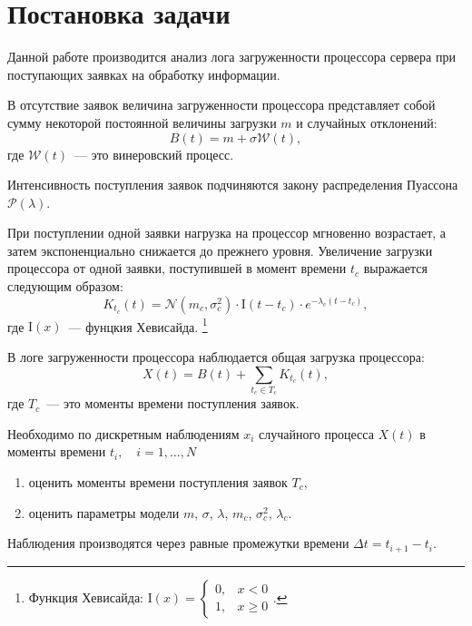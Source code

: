 \documentclass[a4paper,10pt]{article}
\begin{document}



\section{Постановка задачи}
Данной работе производится анализ лога загруженности процессора сервера
при поступающих заявках на обработку информации.

В отсутствие заявок величина загруженности процессора представляет собой 
сумму некоторой постоянной величины загрузки $m$ и случайных отклонений:
$$B(t) = m + \sigma \mathcal{W}(t),$$
где $\mathcal{W}(t)$~--- это винеровский процесс.

Интенсивность поступления заявок подчиняются закону
распределения Пуассона $\mathcal{P}(\lambda)$.

При поступлении одной заявки нагрузка на процессор мгновенно возрастает,
а затем экспоненциально снижается до прежнего уровня.
Увеличение загрузки процессора от одной заявки, 
поступившей в момент времени $t_c$ выражается следующим образом:
$$K_{t_c}(t) = \mathcal{N}(m_c, \sigma_c^2) \cdot \mathrm{I}(t - t_c) \cdot 
    e^{-\lambda_c(t - t_c)},$$
где $\mathrm{I}(x)$~--- фунцкия Хевисайда.%
\footnote{%
Функция Хевисайда: $\mathrm{I}(x) = \left\{
  \begin{array}{rl}
    0, & x < 0 \\
    1, & x \geqslant 0
  \end{array}\right.$.
}

В логе загруженности процессора наблюдается общая загрузка процессора:
$$X(t) = B(t) + \sum\limits_{t_c \in T_c}K_{t_c}(t),$$
где $T_c$~--- это моменты времени поступления заявок.

Необходимо по дискретным наблюдениям $x_i$ случайного процесса $X(t)$ 
в моменты времени $t_i, \quad i=1,\ldots,N$
\begin{enumerate}
 \item оценить моменты времени поступления заявок $T_c$,
 \item оценить параметры модели $m$, $\sigma$, $\lambda$, $m_c$, 
 $\sigma_c^2$, $\lambda_c$.
\end{enumerate}
Наблюдения производятся через равные промежутки времени 
$\Delta t = t_{i+1} - t_i.$
\end{document}
